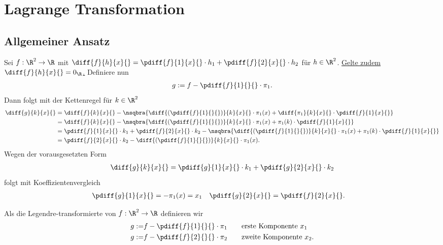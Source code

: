 \documentclass[../WiSe22ANA3.tex]{subfiles}
\begin{document}
		\section{Lagrange Transformation}
			\subsection{Allgemeiner Ansatz}
				Sei $f:\R^2\to\R$ mit $\diff{f}{h}{x}{}=\pdiff{f}{1}{x}{}\cdot h_1+\pdiff{f}{2}{x}{}\cdot h_2$ für $h\in\R^2$. \underline{Gelte zudem $\diff{f}{h}{x}{}=0_\R$.} Definiere nun
				\begin{align*}
					g:=f-\pdiff{f}{1}{}{}\cdot\pi_1.
				\end{align*} 
				Dann folgt mit der Kettenregel für $k\in\R^2$
				\begin{align*}
					\diff{g}{k}{x}{}&=\diff{f}{k}{x}{}-\nsqbra{\diff{(\pdiff{f}{1}{}{})}{k}{x}{}\cdot\pi_1(x)+\diff{\pi_1}{k}{x}{}\cdot\pdiff{f}{1}{x}{}} \\
					&=\diff{f}{k}{x}{}-\nsqbra{\diff{(\pdiff{f}{1}{}{})}{k}{x}{}\cdot\pi_1(x)+\pi_1(k)\cdot\pdiff{f}{1}{x}{}} \\
					&=\pdiff{f}{1}{x}{}\cdot k_1+\pdiff{f}{2}{x}{}\cdot k_2-\nsqbra{\diff{(\pdiff{f}{1}{}{})}{k}{x}{}\cdot\pi_1(x)+\pi_1(k)\cdot\pdiff{f}{1}{x}{}} \\
					&=\pdiff{f}{2}{x}{}\cdot k_2-\diff{(\pdiff{f}{1}{}{})}{k}{x}{}\cdot\pi_1(x).
				\end{align*}
				Wegen der vorausgesetzten Form
				\begin{align*}
					\diff{g}{k}{x}{}=\pdiff{g}{1}{x}{}\cdot k_1+\pdiff{g}{2}{x}{}\cdot k_2
				\end{align*}
				folgt mit Koeffizientenvergleich
				\begin{align*}
					&\pdiff{g}{1}{x}{}=-\pi_1(x)=x_1 &&\pdiff{g}{2}{x}{}=\pdiff{f}{2}{x}{}.
				\end{align*}
				\begin{info}
					Als die Legendre-transformierte von $f:\R^2\to\R$ definieren wir 
					\begin{align*}
						g:=&f-\pdiff{f}{1}{}{}\cdot\pi_1\qquad\text{erste Komponente }x_1\\
						g:=&f-\pdiff{f}{2}{}{}\cdot\pi_2\qquad\text{zweite Komponente }x_2.
					\end{align*}
				\end{info}
\end{document}
